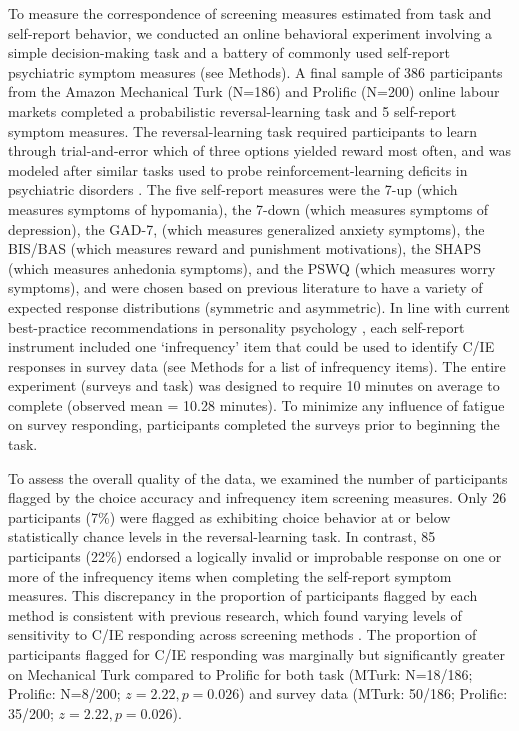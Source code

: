 \documentclass[a4paper,notitlepage,12pt]{article}
\begin{document}
\begin{refsection}[main]
To measure the correspondence of screening measures estimated from task and self-report behavior, we conducted an online behavioral experiment involving a simple decision-making task and a battery of commonly used self-report psychiatric symptom measures (see Methods). A final sample of 386 participants from the Amazon Mechanical Turk (N=186) and Prolific (N=200) online labour markets completed a probabilistic reversal-learning task and 5 self-report symptom measures. The reversal-learning task required participants to learn through trial-and-error which of three options yielded reward most often, and was modeled after similar tasks used to probe reinforcement-learning deficits in psychiatric disorders \cite{waltz2007probabilistic, mukherjee_reward_2020}. The five self-report measures were the 7-up (which measures symptoms of hypomania), the 7-down (which measures symptoms of depression), the GAD-7, (which measures generalized anxiety symptoms), the BIS/BAS (which measures reward and punishment motivations), the SHAPS (which measures anhedonia symptoms), and the PSWQ (which measures worry symptoms), and were chosen based on previous literature to have a variety of expected response distributions (symmetric and asymmetric). In line with current best-practice recommendations in personality psychology \cite{huang2015detecting}, each self-report instrument included one `infrequency' item that could be used to identify C/IE responses in survey data (see Methods for a list of infrequency items). The entire experiment (surveys and task) was designed to require 10 minutes on average to complete (observed mean = 10.28 minutes). To minimize any influence of fatigue on survey responding, participants completed the surveys prior to beginning the task.

To assess the overall quality of the data, we examined the number of participants flagged by the choice accuracy and infrequency item screening measures. Only 26 participants (7\%) were flagged as exhibiting choice behavior at or below statistically chance levels in the reversal-learning task. In contrast, 85 participants (22\%) endorsed a logically invalid or improbable response on one or more of the infrequency items when completing the self-report symptom measures. This discrepancy in the proportion of participants flagged by each method is consistent with previous research, which found varying levels of sensitivity to C/IE responding across screening methods \cite{desimone2018dirty}. The proportion of participants flagged for C/IE responding was marginally but significantly greater on Mechanical Turk compared to Prolific for both task (MTurk: N=18/186; Prolific: N=8/200; $z=2.22, p=0.026$) and survey data (MTurk: 50/186; Prolific: 35/200; $z = 2.22, p = 0.026$).


\end{refsection}
\end{document}
